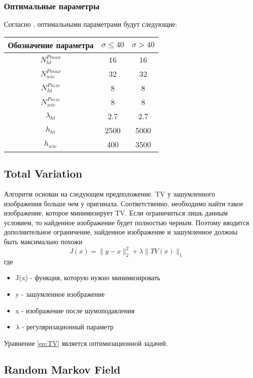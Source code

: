 \subsubsection{Оптимальные параметры}
Согласно \cite{bm3d}, оптимальными параметрами будут следующие:

\begin{tabular}{|c|c|c|}
	\hline
	Обозначение параметра & $\sigma \leq 40$ & $\sigma > 40$\\
	\hline
	$N_{ht}^{Pmax}$ & 16 & 16 \\
	\hline
	$N_{wie}^{Pmax}$ & 32 & 32 \\
	\hline
	$N_{ht}^{Psize}$ & 8 & 8 \\
	\hline
	$N_{wie}^{Psize}$ & 8 & 8 \\
	\hline
	$\lambda_{ht}$ & 2.7 & 2.7 \\
	\hline
	$h_{ht}$ & 2500 & 5000 \\
	\hline
	$h_{wie}$ & 400 & 3500 \\ 
	\hline
	
\end{tabular}

\subsection{Total Variation}
Алгоритм основан на следующем предположение. TV у зашумленного
изображения больше чем у оригинала. Соответственно, необходимо найти
такое изображение, которое минимизирует TV. Если ограничиться лишь
данным условием, то найденное изображение будет полностью черным.
Поэтому вводится дополнительное ограничение, найденное изображение и
зашумленное должны быть максимально похожи
\begin{equation}\label{eq:TV}
J(x)=\parallel y-x \parallel^2_2 + \lambda\parallel TV(x)\parallel_1
\end{equation}
где
\begin{itemize}
	\item J(x) - функция, которую нужно минимизировать
	\item y - зашумленное изображение
	\item x - изображение после шумоподавления
	\item $\lambda$ - регуляризационный параметр 
\end{itemize}
Уравнение \ref{eq:TV} является оптимизационной задачей.
\subsection{Random Markov Field}